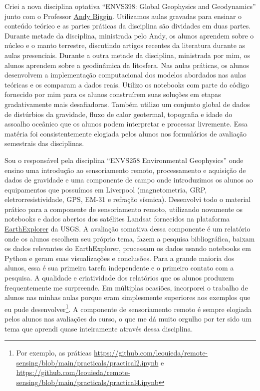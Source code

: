 \documentclass[10pt,a4paper,oneside]{book}
\begin{document}
Criei a nova disciplina optativa ``ENVS398: Global Geophysics and Geodynamics''
junto com o Professor
\href{https://www.liverpool.ac.uk/environmental-sciences/staff/andrew-biggin/}{Andy Biggin}.
Utilizamos aulas gravadas para ensinar o conteúdo teórico e as partes práticas
da disciplina são dividades em duas partes.
Durante metade da disciplina, ministrada pelo Andy, os alunos aprendem sobre o
núcleo e o manto terrestre, discutindo artigos recentes da literatura durante
as aulas presenciais.
Durante a outra metade da disciplina, ministrada por mim, os alunos aprendem
sobre a geodinâmica da litosfera.
Nas aulas práticas, os alunos desenvolvem a implementação computacional dos
modelos abordados nas aulas teóricas e os comparam a dados reais.
Utilizo os notebooks com parte do código fornecido por mim para os alunos
construírem suas soluções em etapas gradativamente mais desafiadoras.
Também utilizo um conjunto global de dados de distúrbios da gravidade,
fluxo de calor geotermal, topografia e idade do assoalho oceânico que os alunos
podem interpretar e processar livremente.
Essa matéria foi consistentemente elogiada pelos alunos nos formulários de
avaliação semestrais das disciplinas.

Sou o responsável pela disciplina ``ENVS258 Environmental Geophysics'' onde
ensino uma introdução ao sensoriamento remoto, processamento e aquisição de
dados de gravidade e uma componente de campo onde introduzimos os alunos ao
equipamentos que possuímos em Liverpool (magnetometria, GRP,
eletrorresistividade, GPS, EM-31 e refração sísmica).
Desenvolvi todo o material prático para a componente de sensoriamento remoto,
utilizando novamente os notebooks e dados abertos dos satélites Landsat
fornecidos na plataforma \href{https://earthexplorer.usgs.gov/}{EarthExplorer}
da USGS.
A avaliação somativa dessa componente é um relatório onde os alunos escolhem
seu próprio tema, fazem a pesquisa bibliográfica, baixam os dados relevantes do
EarthExplorer, processam os dados usando notebooks em Python e geram suas
visualizações e conclusões.
Para a grande maioria dos alunos, essa é sua primeira tarefa independente e o
primeiro contato com a pesquisa.
A qualidade e criatividade dos relatórios que os alunos produzem frequentemente
me surpreende.
Em múltiplas ocasiões, incorporei o trabalho de alunos nas minhas aulas  porque
eram simplesmente superiores aos exemplos que eu pude desenvolver\footnote{Por
exemplo, as práticas
\url{https://github.com/leouieda/remote-sensing/blob/main/practicals/practical2.ipynb}
e
\url{https://github.com/leouieda/remote-sensing/blob/main/practicals/practical4.ipynb}}.
A componente de sensoriamento remoto é sempre elogiada pelos alunos nas
avaliações do curso, o que me dá muito orgulho por ter sido um tema que aprendi
quase inteiramente através dessa disciplina.
\end{document}
